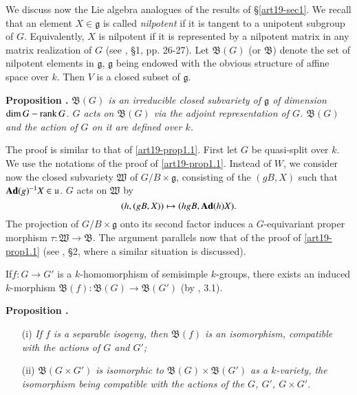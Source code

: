 We discuss now the Lie algebra analogues of the results of \S\ref{art19-sec1}. We recall that an element $X\in \mathfrak{g}$ is called {\em nilpotent} if it is tangent to a unipotent subgroup of $G$. Equivalently, $X$ is nilpotent if it is represented by a nilpotent matrix in any matrix realization of $G$ (see \cite{art19-key1}, \S1, pp. 26-27). Let $\mathfrak{B}(G)$ (or $\mathfrak{B}$) denote the set of nilpotent elements in $\mathfrak{g}$, $\mathfrak{g}$ being endowed with the obvious structure of affine space over $k$. Then $V$ is a closed subset of $\mathfrak{g}$.

\medskip
\noindent
{\bf Proposition .\label{art19-prop2.1}}
{\em $\mathfrak{B}(G)$ is an irreducible closed subvariety of $\mathfrak{g}$ of dimension $\dim G -\operatorname{\mathrm{rank}} G$. $G$ acts on $\mathfrak{B}(G)$ via the adjoint representation of $G$. $\mathfrak{B}(G)$ and the action of $G$ on it are defined over $k$.}
\smallskip

The proof is similar to that of \ref{art19-prop1.1}. First let $G$ be quasi-split over $k$. We use the notations of the proof of \ref{art19-prop1.1}. Instead of $W$, we consider now the closed subvariety $\mathfrak{W}$ of $G/B\times \mathfrak{g}$, consisting of the $(gB,X)$ such that $\mathbf{Ad}(g)^{-1}X\in \mathfrak{u}$. $G$ acts on $\mathfrak{W}$ by
$$
(h,(gB,X))\mapsto (hgB,\mathbf{Ad}(h)X).
$$
The projection of $G/B\times \mathfrak{g}$ onto its second factor induces a $G$-equivariant proper morphism $\tau : \mathfrak{W}\to \mathfrak{B}$. The argument parallels now that of the proof of \ref{art19-prop1.1} (see \cite{art19-key2}, \S2, where a similar situation is discussed).

If\pageoriginale $f:G\to G'$ is a $k$-homomorphism of semisimple $k$-groups, there exists an induced $k$-morphism $\mathfrak{B}(f):\mathfrak{B}(G)\to \mathfrak{B}(G')$ (by \cite{art19-key2}, 3.1).

\eject

\noindent
{\bf Proposition .\label{art19-prop2.2}}
\begin{itemize}
\item[\rm(i)] {\em If $f$ is a separable isogeny, then $\mathfrak{B}(f)$ is an isomorphism, compatible with the actions of $G$ and $G'$;}

\item[\rm(ii)] {\em $\mathfrak{B}(G\times G')$ is isomorphic to $\mathfrak{B}(G)\times \mathfrak{B}(G')$ as a $k$-variety, the isomorphism being compatible with the actions of the $G$, $G'$, $G\times G'$.}
\end{itemize}

